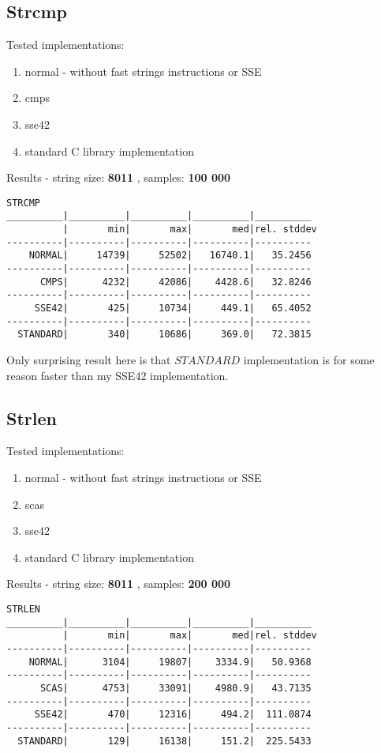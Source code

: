 \documentclass[11pt,a4paper]{article}
\begin{document}
\subsection{Strcmp}\label{subsec:strcmp}
    Tested implementations:
    \begin{enumerate}
        \item normal - without fast strings instructions or SSE
        \item cmps
        \item sse42
        \item standard C library implementation
    \end{enumerate}
Results - string size: \textbf{8011} , samples: \textbf{100 000}
\begin{lstlisting}[]
STRCMP
__________|__________|__________|__________|__________
          |       min|       max|       med|rel. stddev
----------|----------|----------|----------|----------
    NORMAL|     14739|     52502|   16740.1|   35.2456
----------|----------|----------|----------|----------
      CMPS|      4232|     42086|    4428.6|   32.8246
----------|----------|----------|----------|----------
     SSE42|       425|     10734|     449.1|   65.4052
----------|----------|----------|----------|----------
  STANDARD|       340|     10686|     369.0|   72.3815
\end{lstlisting}
Only surprising result here is that $STANDARD$ implementation is for some reason faster than my SSE42 implementation.




\subsection{Strlen}\label{subsec:strlen}
    Tested implementations:
    \begin{enumerate}
        \item normal - without fast strings instructions or SSE
        \item scas
        \item sse42
        \item standard C library implementation
    \end{enumerate}
Results - string size: \textbf{8011} , samples: \textbf{200 000}
\begin{lstlisting}[]
STRLEN
__________|__________|__________|__________|__________
          |       min|       max|       med|rel. stddev
----------|----------|----------|----------|----------
    NORMAL|      3104|     19807|    3334.9|   50.9368
----------|----------|----------|----------|----------
      SCAS|      4753|     33091|    4980.9|   43.7135
----------|----------|----------|----------|----------
     SSE42|       470|     12316|     494.2|  111.0874
----------|----------|----------|----------|----------
  STANDARD|       129|     16138|     151.2|  225.5433
\end{lstlisting}
\end{document}
